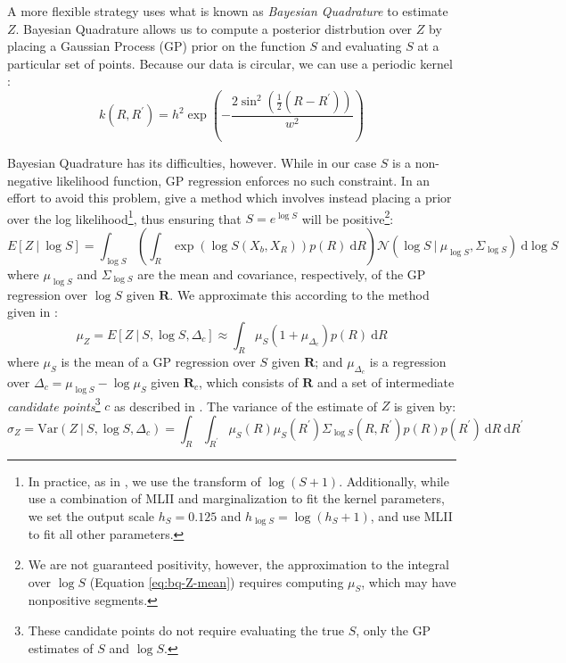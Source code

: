 \documentclass{article} %
\begin{document}
A more flexible strategy uses what is known as \emph{Bayesian
  Quadrature} \cite{Diaconis:1988uo,OHagan:1991tx} to estimate $Z$.
Bayesian Quadrature allows us to compute a posterior distrbution over
$Z$ by placing a Gaussian Process (GP) prior on the function $S$ and
evaluating $S$ at a particular set of points. Because our data is
circular, we can use a periodic kernel \cite{Rasmussen:2006vz}:
\begin{equation}
k(R, R^\prime)=h^2\exp\left(-\frac{2\sin^2\left(\frac{1}{2}(R-R^\prime)\right)}{w^2}\right)
\end{equation}

Bayesian Quadrature has its difficulties, however. While in our case
$S$ is a non-negative likelihood function, GP regression enforces no
such constraint. In an effort to avoid this problem,
\cite{Osborne:2012tm} give a method which involves instead placing a
prior over the log likelihood\footnote{In practice, as in
  \cite{Osborne:2012tm}, we use the transform of
  $\log(S+1)$. Additionally, while \cite{Osborne:2012tm} use a
  combination of MLII and marginalization to fit the kernel
  parameters, we set the output scale $h_S=0.125$ and $h_{\log
    S}=\log(h_S + 1)$, and use MLII to fit all other parameters.},
thus ensuring that $S=e^{\log S}$ will be positive\footnote{We are not
  guaranteed positivity, however, the approximation to the integral
  over $\log S$ (Equation \ref{eq:bq-Z-mean}) requires computing
  $\mu_S$, which may have nonpositive segments.}:
\begin{equation*}
  E[Z\ \vert \ \log S]=\int_{\log S}\left(\int_R \exp(\log{S(X_b,X_R)})p(R)\ \mathrm{d}R\right)\mathcal{N}\left(\log{S}\ \vert \ \mu_{\log S}, \Sigma_{\log S}\right)\ \mathrm{d}\log S
\end{equation*}
where $\mu_{\log S}$ and $\Sigma_{\log S}$ are the mean and
covariance, respectively, of the GP regression over $\log S$ given
$\mathbf{R}$. We approximate this according to the method given in
\cite{Osborne:2012tm}:
\begin{equation}
  \mu_Z=E[Z\ \vert \ S, \log S, \Delta_c] \approx \int_R \mu_{S}(1 + \mu_{\Delta_c}) p(R)\ \mathrm{d}R 
  \label{eq:bq-Z-mean}
\end{equation}
where $\mu_S$ is the mean of a GP regression over $S$ given
$\mathbf{R}$; and $\mu_{\Delta_c}$ is a regression over
$\Delta_c=\mu_{\log S} - \log \mu_S$ given $\mathbf{R}_c$, which
consists of $\mathbf{R}$ and a set of intermediate \emph{candidate
  points}\footnote{These candidate points do not require evaluating
  the true $S$, only the GP estimates of $S$ and $\log S$.} $c$ as
described in \cite{Osborne:2012tm}. The variance of the estimate of
$Z$ is given by:
\begin{equation}
  \sigma_Z=\mathrm{Var}(Z\ \vert \ S, \log S, \Delta_c) = \int_R\int_{R^\prime} \mu_S(R)\mu_S(R^\prime) \Sigma_{\log S}(R, R^\prime)p(R)p(R^\prime)\ \mathrm{d}R\ \mathrm{d}R^\prime
  \label{eq:bq-Z-var}
\end{equation}
\end{document}
